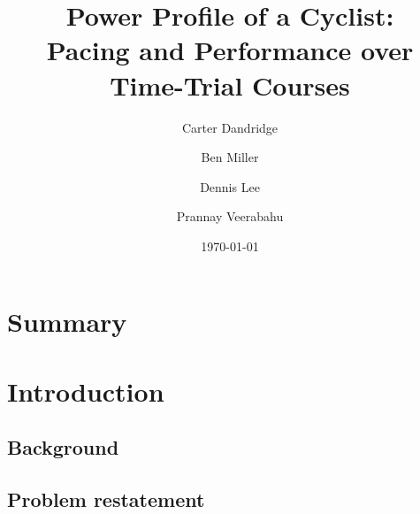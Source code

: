 \documentclass[11pt]{article}
\title{Power Profile of a Cyclist:\\ Pacing and Performance over Time-Trial Courses}
\author{Carter Dandridge \and Ben Miller \and Dennis Lee \and Prannay Veerabahu}
\date{\today}
\begin{document}
\maketitle


\section*{Summary}

\section{Introduction}

\subsection{Background}

\subsection{Problem restatement}
\end{document}
